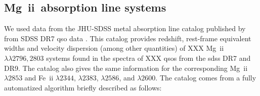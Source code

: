 \documentclass[useAMS,usenatbib]{mn2e}
\newcommand{\mgii}{Mg~{\sc ii}\xspace}
\newcommand{\feii}{Fe~{\sc ii}\xspace}
\begin{document}
\subsection{\mgii\ absorption line systems}\label{sec:data:mgii}

We used data from the JHU-SDSS metal absorption line catalog published
by \citet{Zhu2013} from SDSS DR7 \ac{qso} data \citep{Schneider2010,
  Hewett2010}. This catalog provides redshift, rest-frame equivalent
widths and velocity dispersion (among other quantities) of XXX
\mgii\ $\lambda\lambda 2796, 2803$ systems found in the spectra of XXX
\acp{qso} from the \ac{sdss} DR7 and DR9. The catalog also gives the
same information for the corresponding \mgii $\lambda 2853$ and \feii
$\lambda 2344$, $\lambda 2383$, $\lambda 2586$, and $\lambda 2600$. The
catalog comes from a fully automatized algorithm briefly described as
follows:
\end{document}
